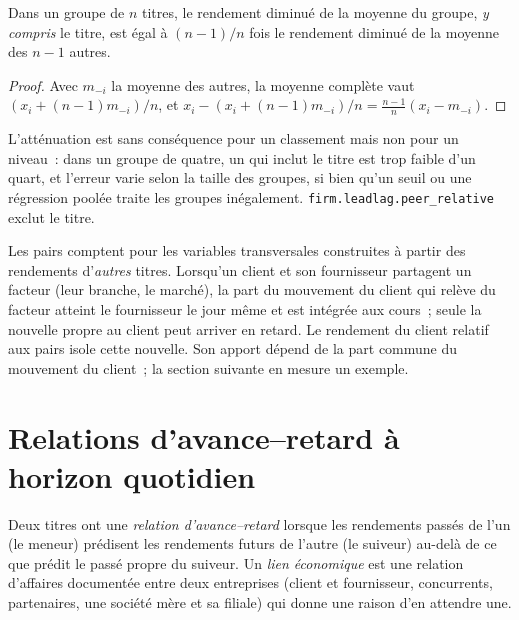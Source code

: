 \begin{proposition}\label{prop:rs:cross-sectional-and-cross-asset-features:loo}
Dans un groupe de $n$ titres, le rendement diminué de la moyenne du groupe, \emph{y compris} le titre, est égal à $(n-1)/n$ fois le rendement
diminué de la moyenne des $n-1$ autres.
\end{proposition}

\begin{proof}
Avec $m_{-i}$ la moyenne des autres, la moyenne complète vaut $(x_i + (n-1)m_{-i})/n$, et $x_i - (x_i + (n-1)m_{-i})/n =
\frac{n-1}{n}(x_i - m_{-i})$.
\end{proof}

L'atténuation est sans conséquence pour un classement mais non pour un niveau~: dans un groupe de quatre, un  qui inclut le
titre est trop faible d'un quart, et l'erreur varie selon la taille des groupes, si bien qu'un seuil ou une régression poolée traite les groupes inégalement.
\texttt{firm.leadlag.peer\_relative} exclut le titre.

Les pairs comptent pour les variables transversales construites à partir des rendements d'\emph{autres} titres. Lorsqu'un client et son fournisseur partagent un
facteur (leur branche, le marché), la part du mouvement du client qui relève du facteur atteint le fournisseur le jour même et est intégrée aux cours~;
seule la nouvelle propre au client peut arriver en retard. Le rendement du client relatif aux pairs isole cette nouvelle. Son apport dépend de
la part commune du mouvement du client~; la section suivante en mesure un exemple.

\section{Relations d'avance--retard à horizon quotidien}

\begin{definition}\label{def:rs:cross-sectional-and-cross-asset-features:leadlag}
Deux titres ont une \emph{relation d'avance--retard} lorsque les rendements passés de l'un (le meneur)
prédisent les rendements futurs de l'autre (le suiveur) au-delà de ce que prédit le passé propre du suiveur. Un \emph{lien
économique} est une relation d'affaires documentée entre deux entreprises (client et fournisseur, concurrents,
partenaires, une société mère et sa filiale) qui donne une raison d'en attendre une.
\end{definition}

